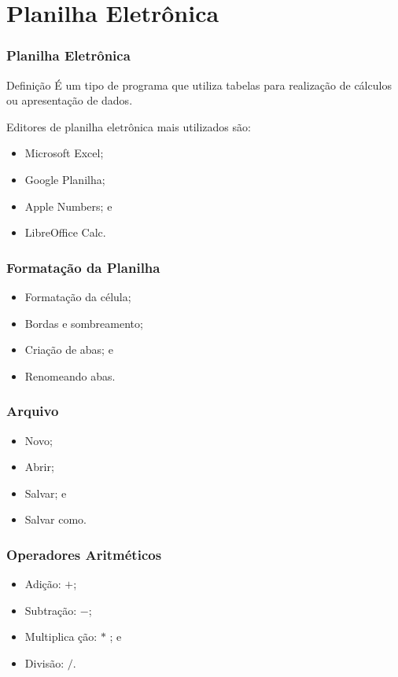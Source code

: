\documentclass[aspectratio=169]{beamer} %
\begin{document}
\section{Planilha Eletrônica}

\begin{frame}
	\frametitle{Planilha Eletrônica}
	
	\begin{block}{Defini\c cão}
		É um tipo de programa que utiliza tabelas para realização de cálculos ou apresentação de dados.
	\end{block}\vfill
	
	Editores de planilha eletrônica mais utilizados são:
	\begin{itemize}
		\item Microsoft Excel;
		\item Google Planilha;
		\item Apple Numbers; e
		\item LibreOffice Calc.
	\end{itemize}
\end{frame}

\begin{frame}
	\frametitle{Formata\c cão da Planilha}
			
	\begin{itemize} 
		\item Formatação da célula;
		\item Bordas e sombreamento;
		\item Criação de abas; e
		\item Renomeando abas.
	\end{itemize}
\end{frame}

\begin{frame}
	\frametitle{Arquivo}
			
	\begin{itemize}
		\item Novo;
		\item Abrir;
		\item Salvar; e
		\item Salvar como.
	\end{itemize}
\end{frame}

\begin{frame}
	\frametitle{Operadores Aritméticos}
			
	\begin{itemize}
		\item Adi\c cão: $+$;
		\item Subtra\c cão: $-$;
		\item Multiplica \c cão: $*$ ; e
		\item Divisão: $/$.
	\end{itemize}
\end{frame}
\end{document}
